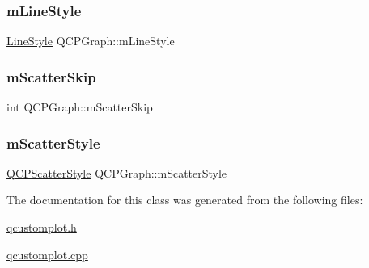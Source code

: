 \subsubsection{\texorpdfstring{m\+Line\+Style}{mLineStyle}}
{\footnotesize\ttfamily \hyperlink{class_q_c_p_graph_ad60175cd9b5cac937c5ee685c32c0859}{Line\+Style} Q\+C\+P\+Graph\+::m\+Line\+Style\hspace{0.3cm}{\ttfamily [protected]}}

\mbox{\label{class_q_c_p_graph_a4ca1e50fbfe8307022b42a6f6178fae0}} 
\subsubsection{\texorpdfstring{m\+Scatter\+Skip}{mScatterSkip}}
{\footnotesize\ttfamily int Q\+C\+P\+Graph\+::m\+Scatter\+Skip\hspace{0.3cm}{\ttfamily [protected]}}

\mbox{\label{class_q_c_p_graph_a4aa36241f166ccd1f75fc8f24e4a3247}} 
\subsubsection{\texorpdfstring{m\+Scatter\+Style}{mScatterStyle}}
{\footnotesize\ttfamily \hyperlink{class_q_c_p_scatter_style}{Q\+C\+P\+Scatter\+Style} Q\+C\+P\+Graph\+::m\+Scatter\+Style\hspace{0.3cm}{\ttfamily [protected]}}



The documentation for this class was generated from the following files\+:\begin{DoxyCompactItemize}
\item 
\hyperlink{qcustomplot_8h}{qcustomplot.\+h}\item 
\hyperlink{qcustomplot_8cpp}{qcustomplot.\+cpp}\end{DoxyCompactItemize}
